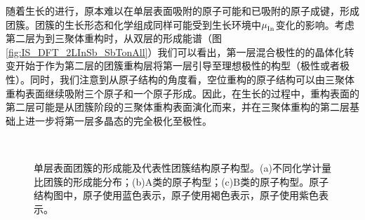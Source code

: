 随着生长的进行，原本难以在单层表面吸附的原子可能和已吸附的原子成键，形成团簇。团簇的生长形态和化学组成同样可能受到生长环境中$\it \mu_{\rm In}^{\rm } \it$变化的影响。考虑第二层为到三聚体重构时，从双层的形成能谱（图\ref{fig:IS_DFT_2LInSb_SbTonAll}）我们可以看出，第一层混合极性的的晶体化转变开始于作为第二层的团簇重构层将第一层引导至理想极性的构型（极性或者极性）。同时，我们注意到从原子结构的角度看，空位重构的原子结构可以由三聚体重构表面继续吸附三个原子和一个原子形成。因此，在生长的过程中，重构表面的第二层可能是从团簇阶段的三聚体重构表面演化而来，并在三聚体重构的第二层基础上进一步将第一层多晶态的完全极化至极性。

\begin{figure}[!htb]
    \\[-1ex]
    \caption{单层表面团簇的形成能及代表性团簇结构原子构型。(a)不同化学计量比团簇的形成能分布；(b)A类的原子构型；(c)B类的原子构型。原子结构图中，原子使用蓝色表示，原子使用褐色表示，原子使用紫色表示。}
    \label{fig:IS_DFT_2InSb_InxSbxT_All}
\end{figure}

